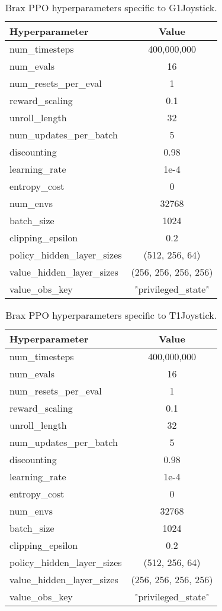 \begin{table}[ht]
\centering
\begin{tabular}{|l|c|} 
\hline
\textbf{Hyperparameter} & \textbf{Value} \\ \hline
num\_timesteps & 400,000,000 \\ \hline
num\_evals & 16  \\ \hline
num\_resets\_per\_eval & 1 \\ \hline
reward\_scaling & 0.1 \\ \hline
unroll\_length & 32 \\ \hline
num\_updates\_per\_batch & 5 \\ \hline
discounting & 0.98 \\ \hline
learning\_rate & 1e-4 \\ \hline
entropy\_cost & 0 \\ \hline
num\_envs & 32768 \\ \hline
batch\_size & 1024 \\ \hline
clipping\_epsilon & 0.2 \\ \hline
policy\_hidden\_layer\_sizes & (512, 256, 64) \\ \hline 
value\_hidden\_layer\_sizes & (256, 256, 256, 256) \\ \hline 
value\_obs\_key & "privileged\_state" \\ \hline
\end{tabular}
\caption{Brax PPO hyperparameters specific to G1Joystick.}
\end{table}

\begin{table}[ht]
\centering
\begin{tabular}{|l|c|} 
\hline
\textbf{Hyperparameter} & \textbf{Value} \\ \hline
num\_timesteps & 400,000,000 \\ \hline
num\_evals & 16  \\ \hline
num\_resets\_per\_eval & 1 \\ \hline
reward\_scaling & 0.1 \\ \hline
unroll\_length & 32 \\ \hline
num\_updates\_per\_batch & 5 \\ \hline
discounting & 0.98 \\ \hline
learning\_rate & 1e-4 \\ \hline
entropy\_cost & 0 \\ \hline
num\_envs & 32768 \\ \hline
batch\_size & 1024 \\ \hline
clipping\_epsilon & 0.2 \\ \hline
policy\_hidden\_layer\_sizes & (512, 256, 64) \\ \hline 
value\_hidden\_layer\_sizes & (256, 256, 256, 256) \\ \hline 
value\_obs\_key & "privileged\_state" \\ \hline
\end{tabular}
\caption{Brax PPO hyperparameters specific to T1Joystick.}
\end{table}

